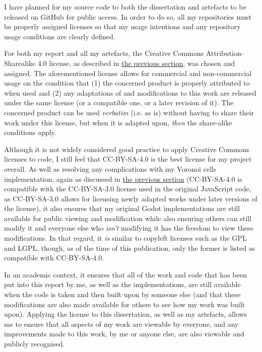 I have planned for my source code to both the dissertation and artefacts to be released on GitHub for public access. In order to do so, all my repositories must be properly assigned licenses so that my usage intentions and any repository usage conditions are clearly defined. 

For both my report and all my artefacts, the Creative Commons Attribution-Sharealike 4.0 license, as described in \hyperref[howuse]{the previous section}, was chosen and assigned. The aforementioned license allows for commercial and non-commercial usage on the condition that (1) the concerned product is properly attributed to when used and (2) any adaptations of and modifications to this work are released under the same license (or a compatible one, or a later revision of it).\cite{cc_at_sa_4} The concerned product can be used \textit{verbatim} (i.e. as is) without having to share their work under this license, but when it is adapted upon, \textit{then} the share-alike conditions apply.

Although it is not widely considered good practice to apply Creative Commons licenses to code\cite{cc_faq_code}, I still feel that CC-BY-SA-4.0 is the best license for my project overall. As well as resolving any complications with my Voronoi cells implementation, again as discussed in \hyperref[howuse]{the previous section} (CC-BY-SA-4.0 is compatible with the CC-BY-SA-3.0 license used in the original JavaScript code, as CC-BY-SA-3.0 allows for licensing newly adapted works under later versions of the license\cite{cc_compat}), it also ensures that my original Godot implementations are still available for public viewing and modification while also ensuring others can still modify it and everyone else who \textit{isn't} modifying it has the freedom to view these modifications. In that regard, it \textit{is} similar to copyleft licenses such as the GPL and LGPL, though, as of the time of this publication, only the former is listed as compatible with CC-BY-SA-4.0.\cite{cc_compat}

In an academic context, it ensures that all of the work and code that has been put into this report by me, as well as the implementations, are still available when the code is taken and then built upon by someone else (and that these modifications are also made available for others to see how my work was built upon). Applying the license to this dissertation, as well as my artefacts, allows me to ensure that all aspects of my work are viewable by everyone, and any improvements made to this work, by me or anyone else, are also viewable and publicly recognised.

